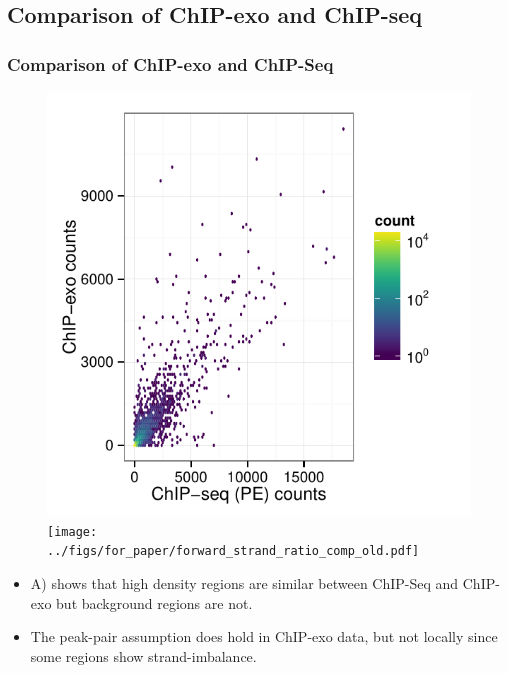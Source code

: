 \documentclass[compress,table,xcolor=dvipsnames]{beamer}\usepackage[]{graphicx}\usepackage[]{color}
\begin{document}
\subsection{Comparison of ChIP-exo and ChIP-seq}


\begin{frame}
  \frametitle{Comparison of ChIP-exo and ChIP-Seq}

\begin{figure}[H]
  \centering
  \includegraphics[width = .5\textwidth,page = 3 ]{../figs/for_paper/ChIPseqPET_ChIPexo_tagCount_comparison.pdf}
  \texttt{[image: ../figs/for\_paper/forward\_strand\_ratio\_comp\_old.pdf]}
\end{figure}

{\small
\begin{itemize}
\item A) shows that high density regions are similar between ChIP-Seq
  and ChIP-exo but background regions are not.
\item The peak-pair assumption does hold in ChIP-exo data, but not
  locally since some regions show strand-imbalance.
\end{itemize}
}

\end{frame}
\end{document}

